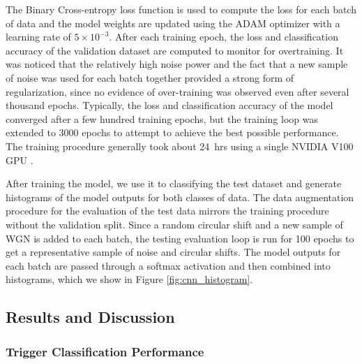 The Binary Cross-entropy loss function is used to compute the loss for each batch of data and the model weights are updated using the ADAM optimizer with a learning rate of $5\times10^{-3}$. After each training epoch, the loss and classification accuracy of the validation dataset are computed to monitor for overtraining. It was noticed that the relatively high noise power and the fact that a new sample of noise was used for each batch together provided a strong form of regularization, since no evidence of over-training was observed even after several thousand epochs. Typically, the loss and classification accuracy of the model converged after a few hundred training epochs, but the training loop was extended to 3000 epochs to attempt to achieve the best possible performance. The training procedure generally took about 24~hrs using a single NVIDIA V100 GPU \cite{v100}.

After training the model, we use it to classifying the test dataset and generate histograms of the model outputs for both classes of data. The data augmentation procedure for the evaluation of the test data mirrors the training procedure without the validation split. Since a random circular shift and a new sample of WGN is added to each batch, the testing evaluation loop is run for 100 epochs to get a representative sample of noise and circular shifts. The model outputs for each batch are passed through a softmax activation and then combined into histograms, which we show in Figure \ref{fig:cnn_histogram}.

\subsection{Results and Discussion}
\label{sec:results}


\subsubsection{Trigger Classification Performance}

